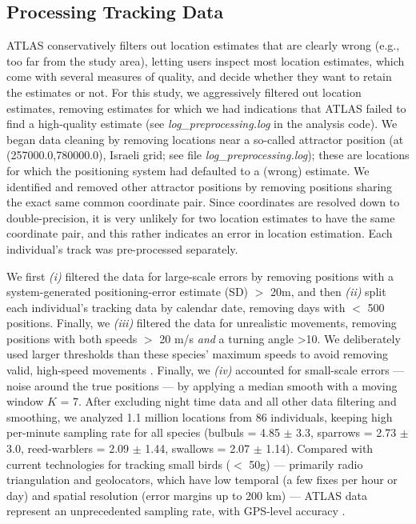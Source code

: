 
\subsection*{Processing Tracking Data}

ATLAS conservatively filters out location estimates that are clearly wrong (e.g., too far from the study area), letting users inspect most location estimates, which come with several measures of quality, 
and decide whether they want to retain the estimates or not. 
For this study, we aggressively filtered out location estimates, removing estimates for which we had indications that ATLAS failed to find a high-quality estimate \citep{gupte2022d} (see \emph{log\_preprocessing.log} in the analysis code).
We began data cleaning by removing locations near a so-called attractor position (at (257000.0,780000.0), Israeli grid; see file \textit{log\_preprocessing.log}); these are locations for which the positioning system had defaulted to a (wrong) estimate.
We identified and removed other attractor positions by removing positions sharing the exact same common coordinate pair. 
Since coordinates are resolved down to double-precision, it is very unlikely for two location estimates to have the same coordinate pair, and this rather indicates an error in location estimation.
Each individual's track was pre-processed separately.

We first \textit{(i)} filtered the data for large-scale errors by removing positions with a system-generated positioning-error estimate (SD) $>$ 20m, and then \textit{(ii)} split each individual's tracking data by calendar date, removing days with $<$ 500 positions. 
Finally, we \textit{(iii)} filtered the data for unrealistic movements, removing positions with both speeds $>$ 20 m/s \emph{and} a turning angle >10\textdegree.
We deliberately used larger thresholds than these species' maximum speeds to avoid removing valid, high-speed movements \citep{gupte2022d}.
Finally, we \textit{(iv)} accounted for small-scale errors --- noise around the true positions --- by applying a median smooth with a moving window $K$ = 7.
After excluding night time data and all other data filtering and smoothing, we analyzed 1.1 million locations from 86 individuals, keeping high per-minute sampling rate for all species (bulbuls = 4.85 $\pm$ 3.3, sparrows = 2.73 $\pm$ 3.0, reed-warblers = 2.09 $\pm$ 1.44, swallows = 2.07 $\pm$ 1.14).
Compared with current technologies for tracking small birds ($<$ 50g) --- primarily radio triangulation and geolocators, which have low temporal (a few fixes per hour or day) and spatial resolution (error margins up to 200 km) \citep{bridge2013} --- ATLAS data represent an unprecedented sampling rate, with GPS-level accuracy \citep{beardsworth2022mee}.

